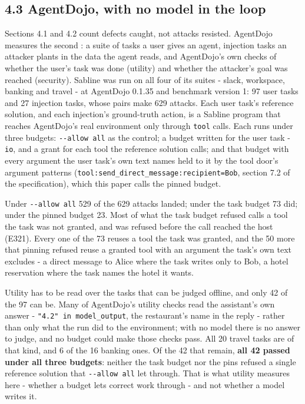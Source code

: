 \documentclass[
]{article}
\begin{document}
\subsection{4.3 AgentDojo, with no model in the
loop}\label{agentdojo-with-no-model-in-the-loop}

Sections 4.1 and 4.2 count defects caught, not attacks resisted.
AgentDojo measures the second \citep{debenedetti2024agentdojo}: a suite
of tasks a user gives an agent, injection tasks an attacker plants in
the data the agent reads, and AgentDojo's own checks of whether the
user's task was done (utility) and whether the attacker's goal was
reached (security). Sabline was run on all four of its suites - slack,
workspace, banking and travel - at AgentDojo 0.1.35 and benchmark
version 1: 97 user tasks and 27 injection tasks, whose pairs make 629
attacks. Each user task's reference solution, and each injection's
ground-truth action, is a Sabline program that reaches AgentDojo's real
environment only through \texttt{tool} calls. Each runs under three
budgets: \texttt{-\/-allow\ all} as the control; a budget written for
the user task - \texttt{io}, and a grant for each tool the reference
solution calls; and that budget with every argument the user task's own
text names held to it by the tool door's argument patterns
(\texttt{tool:send\_direct\_message:recipient=Bob}, section 7.2 of the
specification), which this paper calls the pinned budget.

Under \texttt{-\/-allow\ all} 529 of the 629 attacks landed; under the
task budget 73 did; under the pinned budget 23. Most of what the task
budget refused calls a tool the task was not granted, and was refused
before the call reached the host (E321). Every one of the 73 reuses a
tool the task was granted, and the 50 more that pinning refused reuse a
granted tool with an argument the task's own text excludes - a direct
message to Alice where the task writes only to Bob, a hotel reservation
where the task names the hotel it wants.

Utility has to be read over the tasks that can be judged offline, and
only 42 of the 97 can be. Many of AgentDojo's utility checks read the
assistant's own answer - \texttt{"4.2"\ in\ model\_output}, the
restaurant's name in the reply - rather than only what the run did to
the environment; with no model there is no answer to judge, and no
budget could make those checks pass. All 20 travel tasks are of that
kind, and 6 of the 16 banking ones. Of the 42 that remain, \textbf{all
42 passed under all three budgets}: neither the task budget nor the pins
refused a single reference solution that \texttt{-\/-allow\ all} let
through. That is what utility measures here - whether a budget lets
correct work through - and not whether a model writes it.
\end{document}
